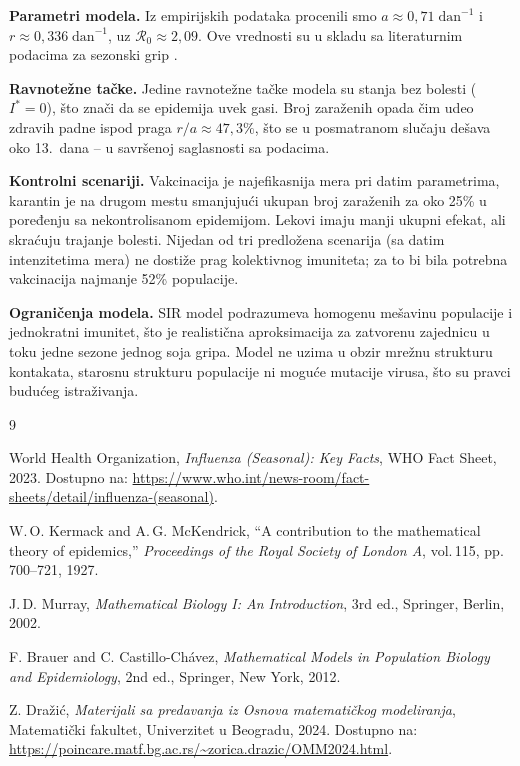 \documentclass[12pt,a4paper]{article}
\begin{document}
	\textbf{Parametri modela.} Iz empirijskih podataka procenili smo $a\approx 0{,}71\;\mathrm{dan}^{-1}$
	i $r\approx 0{,}336\;\mathrm{dan}^{-1}$, uz $\mathcal{R}_0\approx 2{,}09$. Ove vrednosti su u
	skladu sa literaturnim podacima za sezonski grip \cite{Brauer2012}.
	
	\textbf{Ravnotežne tačke.} Jedine ravnotežne tačke modela su stanja bez bolesti ($I^*=0$),
	što znači da se epidemija uvek gasi. Broj zaraženih opada čim udeo zdravih padne ispod praga
	$r/a\approx 47{,}3\%$, što se u posmatranom slučaju dešava oko 13.\ dana -- u savršenoj
	saglasnosti sa podacima.
	
	\textbf{Kontrolni scenariji.} Vakcinacija je najefikasnija mera pri datim parametrima, karantin je na drugom mestu smanjujući ukupan broj zaraženih za oko 25\% u poređenju sa nekontrolisanom
	epidemijom. Lekovi imaju manji ukupni efekat, ali skraćuju trajanje bolesti. Nijedan od tri
	predložena scenarija (sa datim intenzitetima mera) ne dostiže prag kolektivnog imuniteta;
	za to bi bila potrebna vakcinacija najmanje 52\% populacije.
	
	\textbf{Ograničenja modela.} SIR model podrazumeva homogenu mešavinu populacije i
	jednokratni imunitet, što je realistična aproksimacija za zatvorenu zajednicu u toku jedne
	sezone jednog soja gripa. Model ne uzima u obzir mrežnu strukturu kontakata, starosnu
	strukturu populacije ni moguće mutacije virusa, što su pravci budućeg istraživanja.
	
	\newpage
	\begin{thebibliography}{9}
		
		World Health Organization,
		\textit{Influenza (Seasonal): Key Facts},
		WHO Fact Sheet, 2023.
		Dostupno na: \url{https://www.who.int/news-room/fact-sheets/detail/influenza-(seasonal)}.
		
		W.\,O. Kermack and A.\,G. McKendrick,
		``A contribution to the mathematical theory of epidemics,''
		\textit{Proceedings of the Royal Society of London A},
		vol.\,115, pp.\,700--721, 1927.
		
		J.\,D. Murray,
		\textit{Mathematical Biology I: An Introduction},
		3rd ed., Springer, Berlin, 2002.
		
		F. Brauer and C. Castillo-Chávez,
		\textit{Mathematical Models in Population Biology and Epidemiology},
		2nd ed., Springer, New York, 2012.
		
		Z. Dražić,
		\textit{Materijali sa predavanja iz Osnova matematičkog modeliranja},
		Matematički fakultet, Univerzitet u Beogradu, 2024.
		Dostupno na: \url{https://poincare.matf.bg.ac.rs/~zorica.drazic/OMM2024.html}.
		
	\end{thebibliography}
	
\end{document}
